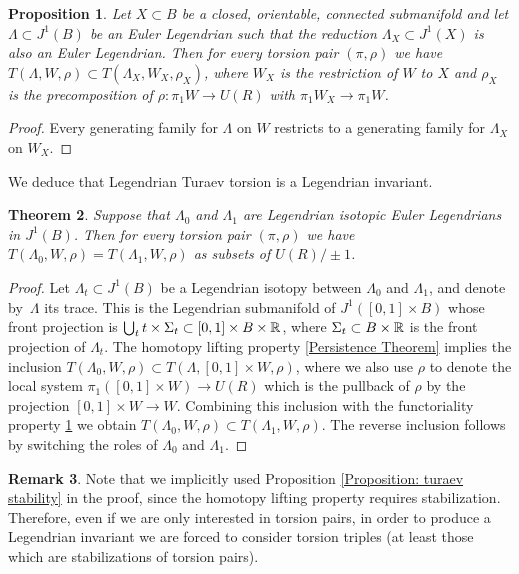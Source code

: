 \documentclass[11pt]{article}
\numberwithin{equation}{section}\providecommand{\dpl}{\displaystyle}
\theoremstyle{plain}
\newtheorem{theorem}{Theorem}[section]
\newtheorem{proposition}[theorem]{Proposition}
\theoremstyle{definition}
\newtheorem{remark}[theorem]{Remark}
\begin{document}
\begin{proposition}\label{functoriality}
Let $X \subset B$ be a closed, orientable, connected submanifold and let $\Lambda \subset J^1(B)$ be an Euler Legendrian such that the reduction $\Lambda_X \subset J^1(X)$ is also an Euler Legendrian. Then for every torsion pair $(\pi, \rho)$ we have $T(\Lambda, W, \rho) \subset T(\Lambda_X, W_X, \rho_X)$, where $W_X$ is the restriction of $W$ to $X$ and $\rho_X$ is the precomposition of $\rho: \pi_1W \to U(R)$ with $\pi_1W_X \to \pi_1W$.
\end{proposition}

\begin{proof}
Every generating family for $\Lambda$ on $W$ restricts to a generating family for $\Lambda_X$ on $W_X$.
\end{proof}

We deduce that Legendrian Turaev torsion is a Legendrian invariant.

\begin{theorem}\label{legendrianinvariant}
Suppose that $\Lambda_0$ and $\Lambda_1$ are Legendrian isotopic Euler Legendrians in $J^1(B)$. Then for every torsion pair $(\pi, \rho)$ we have $T(\Lambda_0, W, \rho) = T(\Lambda_1, W, \rho)$ as subsets of $U(R) / \pm 1$.
\end{theorem}

\begin{proof}
Let $\Lambda_t\subset J^1(B)$ be a Legendrian isotopy between $\Lambda_0$ and $\Lambda_1$, and denote by~$\Lambda$ its trace. This is the Legendrian submanifold of $J^1([0,1] \times B)$ whose front projection is $\bigcup_t t \times \Sigma_t \subset [0,1] \times B \times \mathbb{R}$, where $\Sigma_t \subset B \times \mathbb{R}$ is the front projection of $\Lambda_t$. The homotopy lifting property \ref{Persistence Theorem} implies the inclusion \hbox{$T(\Lambda_0, W, \rho)\!\subset\!T(\Lambda, [0,1] \times W, \rho)$}, where we also use $\rho$ to denote the local system $\pi_1 ([0,1] \times W ) \to U(R)$ which is the pullback of $\rho$ by the projection $[0,1] \times W \to W$. Combining this inclusion with the functoriality property \ref{functoriality} we obtain $T(\Lambda_0, W, \rho) \subset T(\Lambda_1, W, \rho)$. The reverse inclusion follows by switching the roles of $\Lambda_0$ and $\Lambda_1$.
\end{proof}

\begin{remark}\label{remark: need triples}
Note that we implicitly used Proposition \ref{Proposition: turaev stability} in the proof, since the homotopy lifting property requires stabilization. Therefore, even if we are only interested in torsion pairs, in order to produce a Legendrian invariant we are forced to consider torsion triples (at least those which are stabilizations of torsion pairs).
\end{remark}
\end{document}
